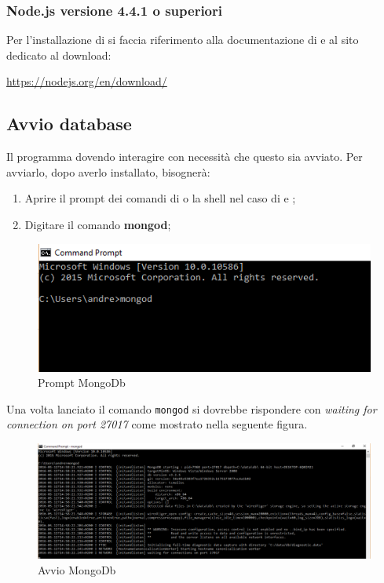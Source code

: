 \documentclass[12pt,a4paper]{article}
\begin{document}
		\subsubsection{Node.js versione 4.4.1 o superiori}
		Per l'installazione di  si faccia riferimento alla documentazione di  e al sito dedicato al download:
		\begin{center} \url{https://nodejs.org/en/download/} 
		\end{center}
	\subsection{Avvio database}
	Il programma dovendo interagire con  necessità che questo sia avviato. Per avviarlo, dopo averlo installato, bisognerà:
	\begin{enumerate}
		\item Aprire il prompt dei comandi di  o la shell nel caso di  e ;
		\item Digitare il comando \textbf{mongod};
	\end{enumerate}
	\begin{center}
		\begin{figure}[H]
			\centering \includegraphics[max width=\textwidth]{../img/manualeSviluppatore/mongod.png}
			\caption{Prompt MongoDb}
		\end{figure}
	\end{center}
	Una volta lanciato il comando \texttt{mongod} si  dovrebbe rispondere con \textit{waiting for connection on port 27017} come mostrato nella seguente figura.
	\begin{center}
		\begin{figure}[H]
			\centering 
			\includegraphics[max width=\textwidth]{../img/manualeSviluppatore/mongodRunning.png}
			\caption{Avvio MongoDb}
		\end{figure}
	\end{center}
	
\end{document}
